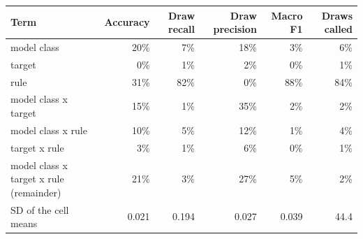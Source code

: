 
\begin{tabular}{lrrrrr}
\toprule
Term & Accuracy & Draw recall & Draw precision & Macro F1 & Draws called\\
\midrule
model class & 20\% & 7\% & 18\% & 3\% & 6\%\\
target & 0\% & 1\% & 2\% & 0\% & 1\%\\
rule & 31\% & 82\% & 0\% & 88\% & 84\%\\
model class x target & 15\% & 1\% & 35\% & 2\% & 2\%\\
model class x rule & 10\% & 5\% & 12\% & 1\% & 4\%\\
target x rule & 3\% & 1\% & 6\% & 0\% & 1\%\\
model class x target x rule (remainder) & 21\% & 3\% & 27\% & 5\% & 2\%\\
SD of the cell means & 0.021 & 0.194 & 0.027 & 0.039 & 44.4\\
\bottomrule
\end{tabular}
